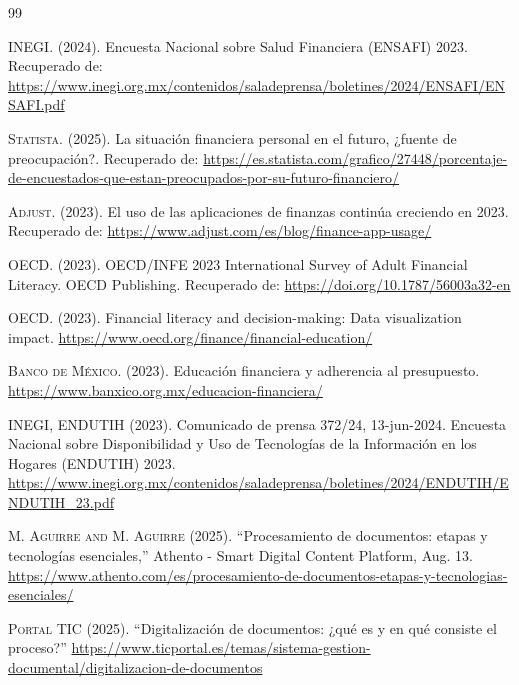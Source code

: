 \renewcommand{\bibname}{Referencias} 

\begin{thebibliography}{99}

\textsc{INEGI.} (2024). Encuesta Nacional sobre Salud Financiera (ENSAFI) 2023.
Recuperado de: \url{https://www.inegi.org.mx/contenidos/saladeprensa/boletines/2024/ENSAFI/ENSAFI.pdf}

\textsc{Statista.} (2025). La situación financiera personal en el futuro, ¿fuente de preocupación?.
Recuperado de: \url{https://es.statista.com/grafico/27448/porcentaje-de-encuestados-que-estan-preocupados-por-su-futuro-financiero/}

\textsc{Adjust.} (2023). El uso de las aplicaciones de finanzas continúa creciendo en 2023.
Recuperado de: \url{https://www.adjust.com/es/blog/finance-app-usage/}

\textsc{OECD.} (2023). OECD/INFE 2023 International Survey of Adult Financial Literacy. OECD Publishing. 
Recuperado de: \url{https://doi.org/10.1787/56003a32-en}

\textsc{OECD.} (2023). Financial literacy and decision-making: Data visualization impact.
\url{https://www.oecd.org/finance/financial-education/}

\textsc{Banco de México.} (2023). Educación financiera y adherencia al presupuesto.
\url{https://www.banxico.org.mx/educacion-financiera/}

\textsc{INEGI, ENDUTIH} (2023). Comunicado de prensa 372/24, 13-jun-2024. Encuesta Nacional sobre Disponibilidad y Uso de Tecnologías de la Información en los Hogares (ENDUTIH) 2023.
\url{https://www.inegi.org.mx/contenidos/saladeprensa/boletines/2024/ENDUTIH/ENDUTIH_23.pdf}

\textsc{M. Aguirre and M. Aguirre} (2025). “Procesamiento de documentos: etapas y tecnologías esenciales,” Athento - Smart Digital Content Platform, Aug. 13.
\url{https://www.athento.com/es/procesamiento-de-documentos-etapas-y-tecnologias-esenciales/}

\textsc{Portal TIC} (2025). “Digitalización de documentos: ¿qué es y en qué consiste el proceso?”
\url{https://www.ticportal.es/temas/sistema-gestion-documental/digitalizacion-de-documentos}


\end{thebibliography}
